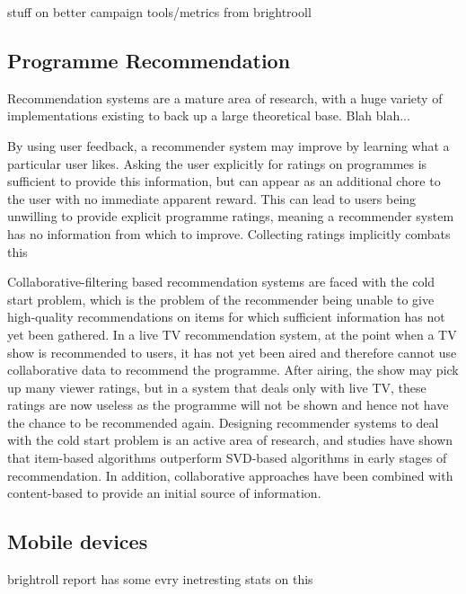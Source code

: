 	stuff on better campaign tools/metrics from brightrooll

	\subsection{Programme Recommendation}

	Recommendation systems are a mature area of research, with a huge variety of implementations existing to back up a large theoretical base. Blah blah...

	By using user feedback, a recommender system may improve by learning what a particular user likes. Asking the user explicitly for ratings on programmes is sufficient to provide this information, but can appear as an additional chore to the user with no immediate apparent reward. This can lead to users being unwilling to provide explicit programme ratings, meaning a recommender system has no information from which to improve. Collecting ratings implicitly combats this 

	Collaborative-filtering based recommendation systems are faced with the cold start problem, which is the problem of the recommender being unable to give high-quality recommendations on items for which sufficient information has not yet been gathered. In a live TV recommendation system, at the point when a TV show is recommended to users, it has not yet been aired and therefore cannot use collaborative data to recommend the programme. After airing, the show may pick up many viewer ratings, but in a system that deals only with live TV, these ratings are now useless as the programme will not be shown and hence not have the chance to be recommended again. Designing recommender systems to deal with the cold start problem is an active area of research, and studies have shown that item-based algorithms outperform SVD-based algorithms in early stages of recommendation\citep{cold-start-problem}. In addition, collaborative approaches have been combined with content-based to provide an initial source of information\citep{generative_models}.

	\subsection{Mobile devices}

	brightroll report has some evry inetresting stats on this

